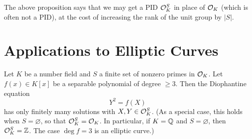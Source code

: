 \begin{remark}
  The above proposition says that we may get a PID
  $\mathcal{O}_K^S$ in place of $\mathcal{O}_K$ (which is often not a
  PID), at the cost of increasing the rank of the unit
  group by $|S|$.
\end{remark}

\section{Applications to Elliptic Curves}

\begin{theorem}[Siegel]
  Let $K$ be a number field and $S$ a finite set
  of nonzero primes in $\mathcal{O}_K$. Let $f(x) \in K[x]$
  be a separable polynomial of degree $\ge 3$.
  Then the Diophantine equation
  \[
    Y^2 = f(X)
  \]
  has only finitely many solutions with
  $X, Y \in \mathcal{O}_K^S$. (As a special case, this holds when
  $S = \varnothing$, so that $\mathcal{O}_K^S = \mathcal{O}_K$. In particular, if $K = \mathbb{Q}$ and $S = \varnothing$, then $\mathcal{O}_K^S = \mathbb{Z}$. The case $\deg f = 3$ is an elliptic curve.)
\end{theorem}

